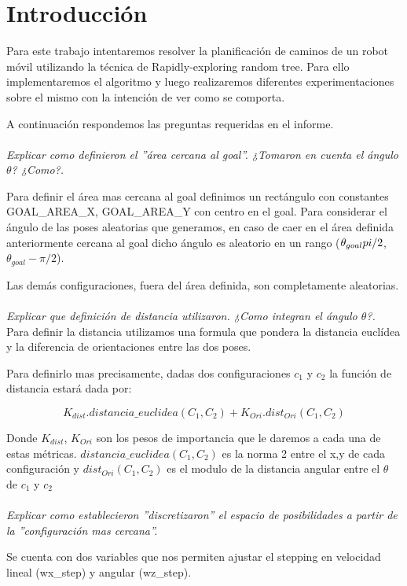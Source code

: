 \section{Introducción}
Para este trabajo intentaremos resolver la planificación de caminos de un robot móvil utilizando la técnica de Rapidly-exploring random tree. Para ello implementaremos el algoritmo y luego realizaremos diferentes experimentaciones sobre el mismo con la intención de ver como se comporta.

A continuación respondemos las preguntas requeridas en el informe.
\\
\\
\textit{Explicar como definieron el ”área cercana al goal”. ¿Tomaron en cuenta el ángulo $\theta$? ¿Como?.}


Para definir el área mas cercana al goal definimos un rectángulo con constantes GOAL\_AREA\_X, GOAL\_AREA\_Y con centro en el goal.  Para considerar el ángulo de las poses aleatorias que generamos, en caso de caer en el área definida anteriormente cercana al goal dicho ángulo es aleatorio en un rango ($\theta_{goal}\-pi/2 $, $ \theta_{goal}-\pi/2$).

Las demás configuraciones, fuera del área definida, son completamente aleatorias.
\\
\\
\textit{Explicar que definición de distancia utilizaron. ¿Como integran el ángulo $\theta$?.}
\\Para definir la distancia utilizamos una formula que pondera la distancia euclídea y la diferencia de orientaciones entre las dos poses.

Para definirlo mas precisamente, dadas dos configuraciones $c_1$ y $c_2$ la función de distancia estará dada por:

$$K_{dist}. distancia\_euclidea(C_1,C_2) + K_{Ori}. dist_{Ori}(C_1,C_2) $$

Donde $K_{dist}$, $K_{Ori}$ son los pesos de importancia que le daremos a cada una de estas métricas. $distancia\_euclidea(C_1,C_2)$ es la norma 2 entre el x,y de cada configuración y $dist_{Ori}(C_1,C_2)$ es el modulo de la distancia angular entre el $\theta$ de $c_1$ y $c_2$ 
\\
\\
\textit{Explicar como establecieron ”discretizaron” el espacio de posibilidades a partir de la ”configuración mas cercana”.}

Se cuenta con dos variables que nos permiten ajustar el stepping en velocidad lineal (wx\_step) y angular (wz\_step).

